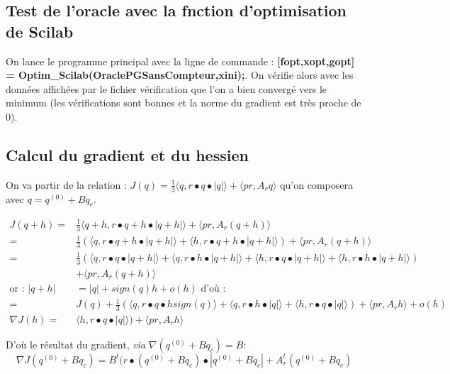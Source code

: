\documentclass[12pt, letterpaper]{article}
\begin{document}
\subsection*{Test de l'oracle avec la fnction d'optimisation de Scilab}

On lance le programme principal avec la ligne de commande : \textbf{[fopt,xopt,gopt] = Optim\_Scilab(OraclePGSansCompteur,xini);}. On vérifie alors avec les données affichées par le fichier vérification que l'on a bien convergé vers le minimum (les vérifications sont bonnes et la norme du gradient est très proche de 0).


\subsection*{Calcul du gradient et du hessien}

On va partir de la relation : $ J(q) = \frac{1}{3}\langle q , r \bullet q \bullet | q | \rangle + \langle pr , A_r q \rangle$ qu'on composera avec $q = q^{(0)} + B q_c$.

\begin{align*}
J(q+h) =& \frac{1}{3}\langle q + h , r \bullet q + h \bullet | q + h | \rangle + \langle pr , A_r (q + h) \rangle \\
=& \frac{1}{3}(\langle q , r \bullet q + h \bullet | q + h | \rangle + \langle h , r \bullet q + h \bullet | q + h | \rangle) + \langle pr , A_r (q + h) \rangle \\
=& \frac{1}{3}(\langle q , r \bullet q \bullet | q + h | \rangle + \langle q , r \bullet h \bullet | q + h | \rangle + \langle h , r \bullet q \bullet | q + h | \rangle + \langle h , r \bullet h \bullet | q + h | \rangle) \\ &+ \langle pr , A_r (q + h) \rangle \\ 
\text{or : } | q + h | &= |q| + sign(q) h + o(h) \text{ d'où :} \\
=& J(q) + \frac{1}{3}(\langle q , r \bullet q \bullet h sign(q) \rangle + \langle q , r \bullet h \bullet | q | \rangle + \langle h , r \bullet q \bullet | q | \rangle) + \langle pr , A_r h \rangle + o(h) \\
\nabla J(h) =& \langle h , r \bullet q \bullet | q | \rangle) + \langle pr , A_r h \rangle
\end{align*}

D'où le résultat du gradient, \emph{via} $\nabla(q^{(0)} + B q_c) = B$: 
$$ \nabla J (q^{(0)} + B q_c) = B^t(r \bullet (q^{(0)} + B q_c) \bullet | q^{(0)} + B q_c | + A_r^t(q^{(0)} + B q_c) $$
\end{document}
